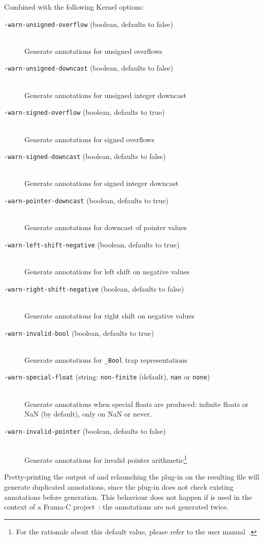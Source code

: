 Combined with the following Kernel options:
\begin{description}
\item[{\tt -warn-unsigned-overflow} (boolean, defaults to false)] \ \smallskip \\
     Generate annotations for unsigned overflows
\item[{\tt -warn-unsigned-downcast} (boolean, defaults to false)] \ \smallskip \\
     Generate annotations for unsigned integer downcast
\item[{\tt -warn-signed-overflow} (boolean, defaults to true)] \ \smallskip \\
     Generate annotations for signed overflows
\item[{\tt -warn-signed-downcast} (boolean, defaults to false)] \ \smallskip \\
     Generate annotations for signed integer downcast
\item[{\tt -warn-pointer-downcast} (boolean, defaults to true)] \ \smallskip \\
     Generate annotations for downcast of pointer values
\item[{\tt -warn-left-shift-negative} (boolean, defaults to true)] \ \smallskip \\
     Generate annotations for left shift on negative values
\item[{\tt -warn-right-shift-negative} (boolean, defaults to false)] \ \smallskip \\
     Generate annotations for right shift on negative values
\item[{\tt -warn-invalid-bool} (boolean, defaults to true)] \ \smallskip \\
     Generate annotations for \lstinline|_Bool| trap representations
\item[{\tt -warn-special-float} (string: {\tt non-finite} (default), {\tt nan} or {\tt none})] \ \smallskip \\
     Generate annotations when special floats are produced: infinite floats or
     NaN (by default), only on NaN or never.
\item[{\tt -warn-invalid-pointer} (boolean, defaults to false)] \ \smallskip \\
     Generate annotations for invalid pointer
     arithmetic\footnote{For the rationale about this default value, please refer to
     the \framac{} user manual~\cite{userman}.}
\end{description}

Pretty-printing the output of \rte{} and relaunching the plug-in on the
resulting file will generate duplicated annotations, since the plug-in does not
check existing annotations before generation. This behaviour does not happen if
\rte{} is used in the context of a Frama-C project~\cite{framacdev}: the
annotations are not generated twice.




\cleardoublepage
{}
{}


